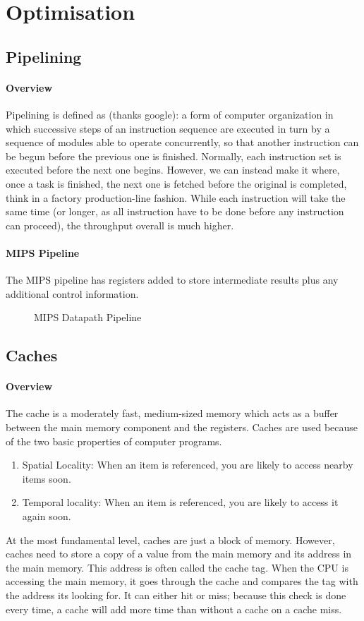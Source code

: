 \section{Optimisation}
\subsection{Pipelining}
\paragraph{Overview}
Pipelining is defined as (thanks google): a form of computer organization in which successive steps of an instruction sequence are executed in turn by a sequence of modules able to operate concurrently, so that another instruction can be begun before the previous one is finished. Normally, each instruction set is executed before the next one begins. However, we can instead make it where, once a task is finished, the next one is fetched before the original is completed, think in a factory production-line fashion. While each instruction will take the same time (or longer, as all instruction have to be done before any instruction can proceed), the throughput overall is much higher.

\paragraph{MIPS Pipeline}
The MIPS pipeline has registers added to store intermediate results plus any additional control information.
 \begin{figure}[!htb]
	\caption{\label{fig:pipeline} MIPS Datapath Pipeline}
\end{figure}

\subsection{Caches}
\paragraph{Overview}The cache is a moderately fast, medium-sized memory which acts as a buffer between the main memory component and the registers. Caches are used because of the two basic properties of computer programs.
\begin{enumerate}
	\item Spatial Locality: When an item is referenced, you are likely to access nearby items soon.
	\item Temporal locality: When an item is referenced, you are likely to access it again soon.
\end{enumerate}
At the most fundamental level, caches are just a block of memory. However, caches need to store a copy of a value from the main memory and its address in the main memory. This address is often called the cache tag. When the CPU is accessing the main memory, it goes through the cache and compares the tag with the address its looking for. It can either hit or miss; because this check is done every time, a cache will add more time than without a cache on a cache miss.
